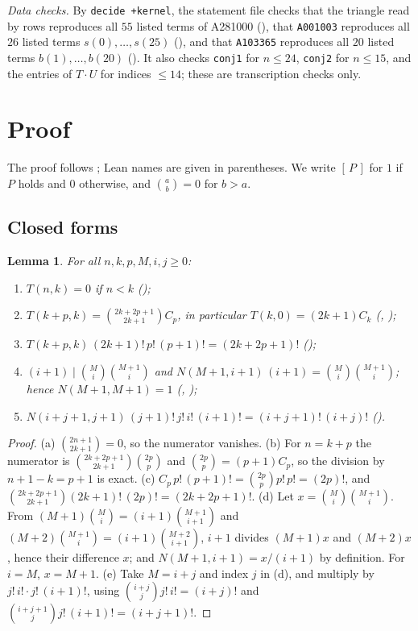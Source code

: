 \documentclass[11pt]{amsart}
\theoremstyle{plain}
\newtheorem{lemma}[theorem]{Lemma}
\theoremstyle{definition}
\newcommand{\ib}[1]{[\,#1\,]}
\begin{document}
\emph{Data checks.} By \texttt{decide +kernel}, the statement file checks that the triangle read by rows reproduces all $55$ listed terms of A281000 (), that \texttt{A001003} reproduces all $26$ listed terms $s(0),\dots,s(25)$ (), and that \texttt{A103365} reproduces all $20$ listed terms $b(1),\dots,b(20)$ (). It also checks \texttt{conj1} for $n\le24$, \texttt{conj2} for $n\le15$, and the entries of $T\cdot U$ for indices $\le14$; these are transcription checks only.

\section{Proof}\label{sec:proof}

The proof follows ; Lean names are given in parentheses. We write $\ib P$ for $1$ if $P$ holds and $0$ otherwise, and $\binom ab=0$ for $b>a$.

\subsection{Closed forms}

\begin{lemma}\label{lem:closed}
For all $n,k,p,M,i,j\ge0$:
\begin{enumerate}
\item[(a)] $T(n,k)=0$ if $n<k$ \quad();
\item[(b)] $T(k+p,k)=\binom{2k+2p+1}{2k+1}C_p$, in particular $T(k,0)=(2k+1)C_k$ \quad(, );
\item[(c)] $T(k+p,k)\,(2k+1)!\,p!\,(p+1)!=(2k+2p+1)!$ \quad();
\item[(d)] $(i+1)\mid\binom Mi\binom{M+1}i$ and $N(M+1,i+1)\,(i+1)=\binom Mi\binom{M+1}i$; hence $N(M+1,M+1)=1$ \quad(, );
\item[(e)] $N(i+j+1,j+1)\,(j+1)!\,j!\,i!\,(i+1)!=(i+j+1)!\,(i+j)!$ \quad().
\end{enumerate}
\end{lemma}

\begin{proof}
(a) $\binom{2n+1}{2k+1}=0$, so the numerator vanishes. (b) For $n=k+p$ the numerator is $\binom{2k+2p+1}{2k+1}\binom{2p}{p}$ and $\binom{2p}p=(p+1)C_p$, so the division by $n+1-k=p+1$ is exact. (c) $C_p\,p!\,(p+1)!=\binom{2p}{p}p!\,p!=(2p)!$, and $\binom{2k+2p+1}{2k+1}(2k+1)!\,(2p)!=(2k+2p+1)!$. (d) Let $x=\binom Mi\binom{M+1}i$. From $(M+1)\binom Mi=(i+1)\binom{M+1}{i+1}$ and $(M+2)\binom{M+1}i=(i+1)\binom{M+2}{i+1}$, $i+1$ divides $(M+1)x$ and $(M+2)x$, hence their difference $x$; and $N(M+1,i+1)=x/(i+1)$ by definition. For $i=M$, $x=M+1$. (e) Take $M=i+j$ and index $j$ in (d), and multiply by $j!\,i!\cdot j!\,(i+1)!$, using $\binom{i+j}{j}j!\,i!=(i+j)!$ and $\binom{i+j+1}{j}j!\,(i+1)!=(i+j+1)!$.
\end{proof}
\end{document}
